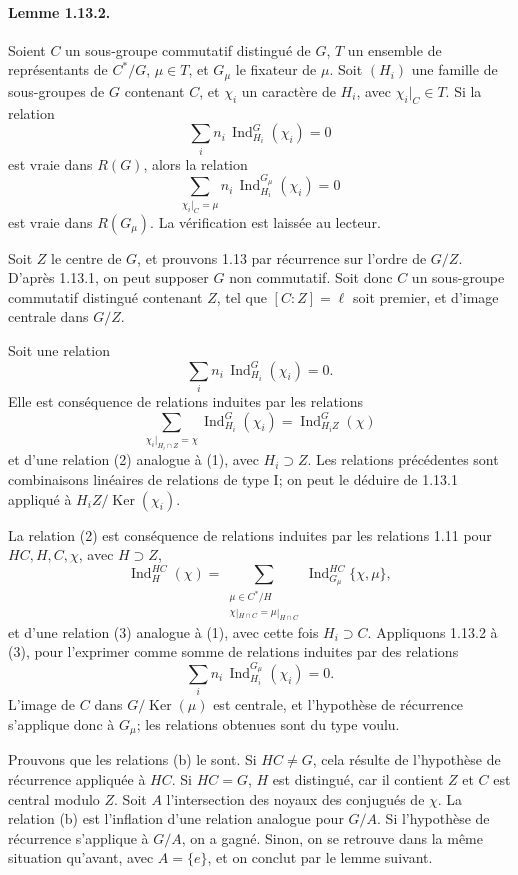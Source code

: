 \documentclass[10pt]{article}
\newcommand{\Ind}{\operatorname{Ind}}
\providecommand{\Ker}{\operatorname{Ker}}
\providecommand{\Ind}{\operatorname{Ind}}
\providecommand{\Ker}{\operatorname{Ker}}
\begin{document}
\paragraph{Lemme 1.13.2.} Soient \(C\) un sous-groupe commutatif distingué de \(G\), \(T\) un ensemble de représentants de \(C^*/G\), \(\mu\in T\), et \(G_\mu\) le fixateur de \(\mu\). Soit \((H_i)\) une famille de sous-groupes de \(G\) contenant \(C\), et \(\chi_i\) un caractère de \(H_i\), avec \(\chi_i|_C\in T\). Si la relation
\[
\sum_i n_i\,\Ind_{H_i}^G(\chi_i)=0
\]
est vraie dans \(R(G)\), alors la relation
\[
\sum_{\chi_i|_C=\mu}
n_i\,\Ind_{H_i}^{G_\mu}(\chi_i)=0
\]
est vraie dans \(R(G_\mu)\). La vérification est laissée au lecteur.

Soit \(Z\) le centre de \(G\), et prouvons 1.13 par récurrence sur l'ordre de \(G/Z\). D'après 1.13.1, on peut supposer \(G\) non commutatif. Soit donc \(C\) un sous-groupe commutatif distingué contenant \(Z\), tel que \([C:Z]=\ell\) soit premier, et d'image centrale dans \(G/Z\).

Soit une relation
\[
\tag{1}
\sum_i n_i\,\Ind_{H_i}^G(\chi_i)=0.
\]
Elle est conséquence de relations induites par les relations
\[
\sum_{\chi_i|_{H_i\cap Z}=\chi}\Ind_{H_i}^G(\chi_i)=\Ind_{H_iZ}^G(\chi)
\]
et d'une relation (2) analogue à (1), avec \(H_i\supset Z\). Les relations précédentes sont combinaisons linéaires de relations de type I; on peut le déduire de 1.13.1 appliqué à \(H_iZ/\Ker(\chi_i)\).

La relation (2) est conséquence de relations induites par les relations 1.11 pour \(HC,H,C,\chi\), avec \(H\supset Z\),
\[
\tag{b}
\Ind_H^{HC}(\chi)=
\sum_{\substack{\mu\in C^*/H\\ \chi|_{H\cap C}=\mu|_{H\cap C}}}
\Ind_{G_\mu}^{HC}\{\chi,\mu\},
\]
et d'une relation (3) analogue à (1), avec cette fois \(H_i\supset C\). Appliquons 1.13.2 à (3), pour l'exprimer comme somme de relations induites par des relations
\[
\sum_i n_i\,\Ind_{H_i}^{G_\mu}(\chi_i)=0.
\]
L'image de \(C\) dans \(G/\Ker(\mu)\) est centrale, et l'hypothèse de récurrence s'applique donc à \(G_\mu\); les relations obtenues sont du type voulu.

Prouvons que les relations (b) le sont. Si \(HC\ne G\), cela résulte de l'hypothèse de récurrence appliquée à \(HC\). Si \(HC=G\), \(H\) est distingué, car il contient \(Z\) et \(C\) est central modulo \(Z\). Soit \(A\) l'intersection des noyaux des conjugués de \(\chi\). La relation (b) est l'inflation d'une relation analogue pour \(G/A\). Si l'hypothèse de récurrence s'applique à \(G/A\), on a gagné. Sinon, on se retrouve dans la même situation qu'avant, avec \(A=\{e\}\), et on conclut par le lemme suivant.
\end{document}
